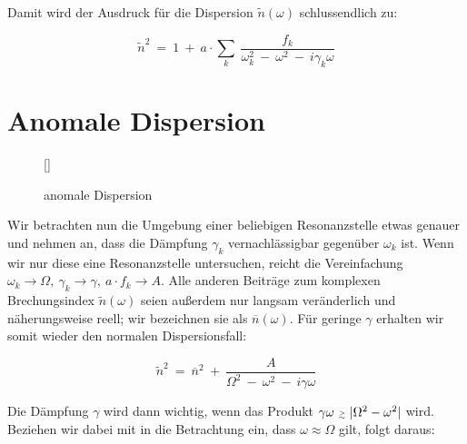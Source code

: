 Damit wird der Ausdruck für die Dispersion $\tilde{n}(\omega)$ schlussendlich zu:

\begin{equation*}
\tilde{n}^2 \ = \ 1 \ + \ a \cdot\sum_k \ \frac{f_k}{\omega_k^2 \ - \ \omega^2 \ - \ i\gamma_k\omega}
\end{equation*}

\section{Anomale Dispersion}

\begin{wrapfigure}[]{r}[0cm]{0cm}
	\raisebox{0pt}[\dimexpr{}\baselineskip\relax]{
		\colorbox{hgrey}{
		} 
	}
	\caption{anomale Dispersion}
\end{wrapfigure}

Wir betrachten nun die Umgebung einer beliebigen Resonanzstelle etwas genauer und nehmen an, dass die Dämpfung $\gamma_k$ vernachlässigbar gegenüber $\omega_k$ ist. Wenn wir nur diese eine Resonanzstelle untersuchen, reicht die Vereinfachung $\omega_k \rightarrow \Omega, \ \gamma_k \rightarrow\gamma, \ a \cdot f_k \rightarrow A$. Alle anderen Beiträge zum komplexen Brechungsindex $\tilde{n}(\omega)$ seien außerdem nur  langsam veränderlich und näherungsweise reell; wir bezeichnen sie als $\overline{n}(\omega)$. Für geringe $\gamma$ erhalten wir somit wieder den normalen Dispersionsfall:

\begin{equation*}
\tilde{n}^2  \ = \  \overline{n}^2 \ + \ \frac{A}{\Omega^2 \ - \ \omega^2 \ - \ i\gamma\omega}
\end{equation*}

Die Dämpfung $\gamma$ wird dann wichtig, wenn das Produkt $\gamma\omega \ \mathsmaller{\mathsmaller{\gtrsim}} \ |\Omega^2 - \omega^2|$ wird. Beziehen wir dabei mit in die Betrachtung ein, dass $\omega\approx\Omega$ gilt, folgt daraus:

